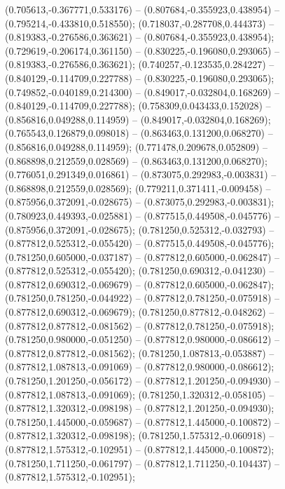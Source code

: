  (0.705613,-0.367771,0.533176) -- (0.807684,-0.355923,0.438954) -- (0.795214,-0.433810,0.518550);
 (0.718037,-0.287708,0.444373) -- (0.819383,-0.276586,0.363621) -- (0.807684,-0.355923,0.438954);
 (0.729619,-0.206174,0.361150) -- (0.830225,-0.196080,0.293065) -- (0.819383,-0.276586,0.363621);
 (0.740257,-0.123535,0.284227) -- (0.840129,-0.114709,0.227788) -- (0.830225,-0.196080,0.293065);
 (0.749852,-0.040189,0.214300) -- (0.849017,-0.032804,0.168269) -- (0.840129,-0.114709,0.227788);
 (0.758309,0.043433,0.152028) -- (0.856816,0.049288,0.114959) -- (0.849017,-0.032804,0.168269);
 (0.765543,0.126879,0.098018) -- (0.863463,0.131200,0.068270) -- (0.856816,0.049288,0.114959);
 (0.771478,0.209678,0.052809) -- (0.868898,0.212559,0.028569) -- (0.863463,0.131200,0.068270);
 (0.776051,0.291349,0.016861) -- (0.873075,0.292983,-0.003831) -- (0.868898,0.212559,0.028569);
 (0.779211,0.371411,-0.009458) -- (0.875956,0.372091,-0.028675) -- (0.873075,0.292983,-0.003831);
 (0.780923,0.449393,-0.025881) -- (0.877515,0.449508,-0.045776) -- (0.875956,0.372091,-0.028675);
 (0.781250,0.525312,-0.032793) -- (0.877812,0.525312,-0.055420) -- (0.877515,0.449508,-0.045776);
 (0.781250,0.605000,-0.037187) -- (0.877812,0.605000,-0.062847) -- (0.877812,0.525312,-0.055420);
 (0.781250,0.690312,-0.041230) -- (0.877812,0.690312,-0.069679) -- (0.877812,0.605000,-0.062847);
 (0.781250,0.781250,-0.044922) -- (0.877812,0.781250,-0.075918) -- (0.877812,0.690312,-0.069679);
 (0.781250,0.877812,-0.048262) -- (0.877812,0.877812,-0.081562) -- (0.877812,0.781250,-0.075918);
 (0.781250,0.980000,-0.051250) -- (0.877812,0.980000,-0.086612) -- (0.877812,0.877812,-0.081562);
 (0.781250,1.087813,-0.053887) -- (0.877812,1.087813,-0.091069) -- (0.877812,0.980000,-0.086612);
 (0.781250,1.201250,-0.056172) -- (0.877812,1.201250,-0.094930) -- (0.877812,1.087813,-0.091069);
 (0.781250,1.320312,-0.058105) -- (0.877812,1.320312,-0.098198) -- (0.877812,1.201250,-0.094930);
 (0.781250,1.445000,-0.059687) -- (0.877812,1.445000,-0.100872) -- (0.877812,1.320312,-0.098198);
 (0.781250,1.575312,-0.060918) -- (0.877812,1.575312,-0.102951) -- (0.877812,1.445000,-0.100872);
 (0.781250,1.711250,-0.061797) -- (0.877812,1.711250,-0.104437) -- (0.877812,1.575312,-0.102951);
